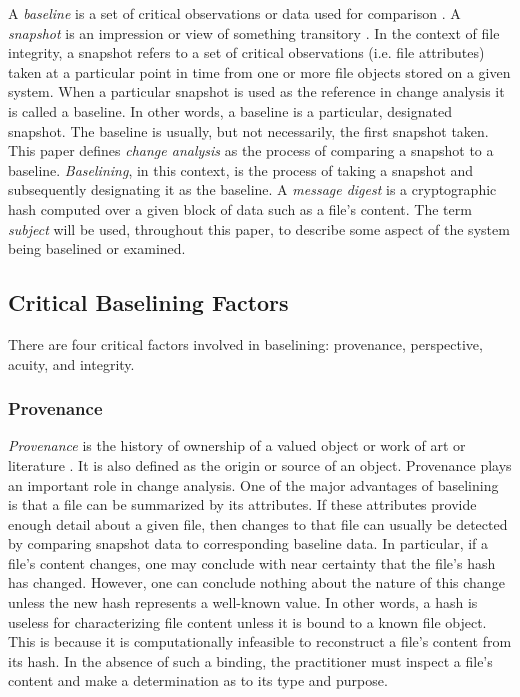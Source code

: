 \documentclass[10pt]{article}
\begin{document}
A {\it baseline} is a set of critical observations or data used
for comparison \cite{dictionary}.  A {\it snapshot} is an impression
or view of something transitory \cite{dictionary}.  In the context
of file integrity, a snapshot refers to a set of critical observations
(i.e. file attributes) taken at a particular point in time from
one or more file objects stored on a given system.  When a particular
snapshot is used as the reference in change analysis it is called
a baseline.  In other words, a baseline is a particular, designated
snapshot.  The baseline is usually, but not necessarily, the first
snapshot taken.  This paper defines {\it change analysis} as the
process of comparing a snapshot to a baseline.  {\it Baselining},
in this context, is the process of taking a snapshot and subsequently
designating it as the baseline.  A {\it message digest} is a
cryptographic hash computed over a given block of data such as a
file's content.  The term {\it subject} will be used, throughout
this paper, to describe some aspect of the system being baselined
or examined.

\subsection{Critical Baselining Factors}

There are four critical factors involved in baselining: provenance,
perspective, acuity, and integrity.

\subsubsection{Provenance}

{\it Provenance} is the history of ownership of a valued object or
work of art or literature \cite{dictionary}.  It is also defined as
the origin or source of an object.  Provenance plays an important
role in change analysis.  One of the major advantages of baselining
is that a file can be summarized by its attributes.  If these
attributes provide enough detail about a given file, then changes
to that file can usually be detected by comparing snapshot data to
corresponding baseline data.  In particular, if a file's content
changes, one may conclude with near certainty that the file's
hash has changed.  However, one can conclude nothing about the
nature of this change unless the new hash represents a well-known
value.  In other words, a hash is useless for characterizing file
content unless it is bound to a known file object.  This is because
it is computationally infeasible to reconstruct a file's content
from its hash.  In the absence of such a binding, the practitioner
must inspect a file's content and make a determination as to its
type and purpose.
\end{document}
